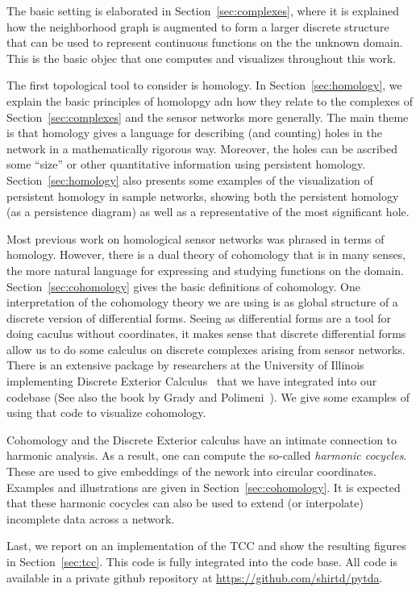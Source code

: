   The basic setting is elaborated in Section~\ref{sec:complexes}, where it is explained how the neighborhood graph is augmented to form a larger discrete structure that can be used to represent continuous functions on the the unknown domain.
  This is the basic objec that one computes and visualizes throughout this work.

  The first topological tool to consider is homology.
  In Section~\ref{sec:homology}, we explain the basic principles of homolopgy adn how they relate to the complexes of Section~\ref{sec:complexes} and the sensor networks more generally.
  The main theme is that homology gives a language for describing (and counting) holes in the network in a mathematically rigorous way.
  Moreover, the holes can be ascribed some ``size'' or other quantitative information using persistent homology.
  Section~\ref{sec:homology} also presents some examples of the visualization of persistent homology in sample networks, showing both the persistent homology (as a persistence diagram) as well as a representative of the most significant hole.

  Most previous work on homological sensor networks was phrased in terms of homology.
  However, there is a dual theory of cohomology that is in many senses, the more natural language for expressing and studying functions on the domain.
  Section~\ref{sec:cohomology} gives the basic definitions of cohomology.
  One interpretation of the cohomology theory we are using is as global structure of a discrete version of differential forms.
  Seeing as differential forms are a tool for doing caculus without coordinates, it makes sense that discrete differential forms allow us to do some calculus on discrete complexes arising from sensor networks.
  There is an extensive package by researchers at the University of Illinois implementing Discrete Exterior Calculus~\cite{bell12pydec} that we have integrated into our codebase (See also the book by Grady and Polimeni~\cite{grady10discrete}).
  We give some examples of using that code to visualize cohomology.

  Cohomology and the Discrete Exterior calculus have an intimate connection to harmonic analysis.
  As a result, one can compute the so-called \emph{harmonic cocycles}.
  These are used to give embeddings of the nework into circular coordinates.
  Examples and illustrations are given in Section~\ref{sec:cohomology}.
  It is expected that these harmonic cocycles can also be used to extend (or interpolate) incomplete data across a network.

  Last, we report on an implementation of the TCC and show the resulting figures in Section~\ref{sec:tcc}.
  This code is fully integrated into the code base.
  All code is available in a private github repository at \url{https://github.com/shirtd/pytda}.



